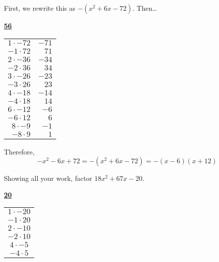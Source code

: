 \documentclass[11pt,letterpaper]{article}
\begin{document}
\sol First, we rewrite this as $-(x^2 + 6x - 72)$. Then\dots
	\begin{table}[!ht]
	\centering
	\underline{\bfseries 56} \pvspace{0.2cm}
	\begin{tabular}{rr}
	$1 \cdot -72$ & $-71$ \\
	$-1 \cdot 72$ & $71$ \\
	$2 \cdot -36$ & $-34$ \\
	$-2 \cdot 36$ & $34$ \\
	$3 \cdot -26$ & $-23$ \\
	$-3 \cdot 26$ & $23$ \\
	$4 \cdot -18$ & $-14$ \\
	$-4 \cdot 18$ & $14$ \\
	$6 \cdot -12$ & $-6$ \\ \hline
	\multicolumn{1}{|r}{$-6 \cdot 12$} & \multicolumn{1}{r|}{$6$} \\ \hline
	$8 \cdot -9$ & $-1$ \\
	$-8 \cdot 9$ & $1$ \\	
	\end{tabular}
	\end{table}

Therefore,
	\[
	-x^2 - 6x + 72= -(x^2 + 6x - 72)= -(x - 6)(x + 12)
	\]



\newpage



 Showing all your work, factor $18x^2 + 67x - 20$. \pspace

\sol 
	\begin{table}[!ht]
	\centering
	\underline{\bfseries 20} \pvspace{0.1cm}
	\begin{tabular}{c}
	$1 \cdot -20$ \\
	$-1 \cdot 20$ \\
	$2 \cdot -10$ \\
	$-2 \cdot 10$ \\
	$4 \cdot -5$ \\
	$-4 \cdot 5$
	\end{tabular}
	\end{table}
\end{document}
